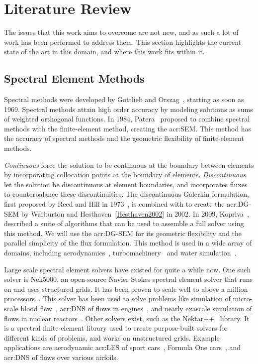\chapter{Literature Review}\label{chapter:literature_review} 

The issues that this work aims to overcome are not new, and as such a lot of work has been performed
to address them. This section highlights the current state of the art in this domain, and where this
work fits within it.

\section{Spectral Element Methods}\label{section:literature_review:sem}

Spectral methods were developed by Gottlieb and Orszag~\cite{Gottlieb1977}, starting as soon as
1969. Spectral methods attain high order accuracy by modeling solutions as sums of weighted
orthogonal functions. In 1984, Patera~\cite{Patera1984} proposed to combine spectral methods with
the finite-element method, creating the \acrfull{acr:SEM}. This method has the accuracy of spectral
methods and the geometric flexibility of finite-element methods.

\textit{Continuous}  force the solution to be continuous at the boundary between
elements by incorporating collocation points at the boundary of elements. \textit{Discontinuous}
 let the solution be discontinuous at element boundaries, and incorporates fluxes
to counterbalance these discontinuities. The discontinuous Galerkin formulation, first proposed by
Reed and Hill in 1973~\cite{Reed1973}, is combined with  to create the
\acrfull{acr:DG-SEM} by Warburton and Hesthaven~\ref{Hesthaven2002} in 2002. In 2009,
Kopriva~\cite{Kopriva2009}, described a suite of algorithms that can be used to assemble a full
solver using this method. We will use the \acrshort{acr:DG-SEM} for its geometric flexibility and
the parallel simplicity of the flux formulation. This method is used in a wide array of domains,
including aerodynamics~\cite{Beck2014}, turbomachinery~\cite{Garai2015} and water
simulation~\cite{Gassner2016}.

Large scale spectral element solvers have existed for quite a while now. One such solver is Nek5000,
an open-source Navier Stokes spectral element solver that runs on  and uses
structured grids. It has been proven to scale well to above a million
processors~\cite{Offermans2017}. This solver has been used to solve problems like simulation of
micro-scale blood flow~\cite{Obabko2017}, \acrfull{acr:DNS} of flows in engines~\cite{Ameen2020},
and nearly exascale simulation of flows in nuclear reactors~\cite{Merzari2020}. Other solvers exist,
such as the Nektar++~\cite{Cantwell2015} library. It is a spectral finite element library used to
create purpose-built solvers for different kinds of problems, and works on unstructured grids.
Example applications are aerodynamic \acrfull{acr:LES} of sport cars~\cite{Mengaldo2020}, Formula
One cars~\cite{Cantwell2015}, and \acrshort{acr:DNS} of flows over various airfoils.

